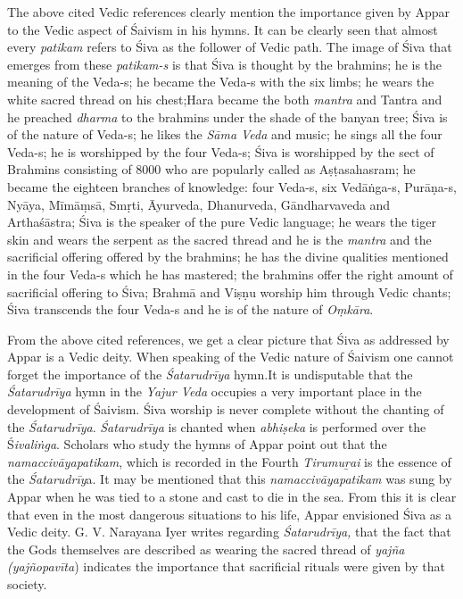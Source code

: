 The above cited Vedic references clearly mention the importance given by Appar to the Vedic aspect of Śaivism in his hymns. It can be clearly seen that almost every \textit{patikam} refers to Śiva as the follower of Vedic path. The image of Śiva that emerges from these \textit{patikam-s} is that Śiva is thought by the brahmins; he is the meaning of the Veda-s; he became the Veda-s with the six limbs; he wears the white sacred thread on his chest;Hara became the both \textit{mantra} and Tantra and he preached \textit{dharma} to the brahmins under the shade of the banyan tree; Śiva is of the nature of Veda-s; he likes the \textit{Sāma Veda} and music; he sings all the four Veda-s; he is worshipped by the four Veda-s; Śiva is worshipped by the sect of Brahmins consisting of 8000 who are popularly called as Aṣṭasahasram; he became the eighteen branches of knowledge: four Veda-s, six Vedāṅga-s, Purāṇa-s, Nyāya, Mīmāṃsā, Smṛti, Āyurveda, Dhanurveda, Gāndharvaveda and Arthaśāstra; Śiva is the speaker of the pure Vedic language; he wears the tiger skin and wears the serpent as the sacred thread and he is the \textit{mantra} and the sacrificial offering offered by the brahmins; he has the divine qualities mentioned in the four Veda-s which he has mastered; the brahmins offer the right amount of sacrificial offering to Śiva; Brahmā and Viṣṇu worship him through Vedic chants; Śiva transcends the four Veda-s and he is of the nature of \textit{Oṃkāra}.

From the above cited references, we get a clear picture that Śiva as addressed by Appar is a Vedic deity. When speaking of the Vedic nature of Śaivism one cannot forget the importance of the \textit{Śatarudrīya} hymn.It is undisputable that the \textit{Śatarudrīya} hymn in the \textit{Yajur Veda} occupies a very important place in the development of Śaivism. Śiva worship is never complete without the chanting of the \textit{Śatarudrīya}. \textit{Śatarudrīya} is chanted when \textit{abhiṣeka }is performed over the Ś\textit{ivaliṅga}. Scholars who study the hymns of Appar point out that the \textit{namaccivāyapatikam}, which is recorded in the Fourth \textit{Tirumuṟai} is the essence of the \textit{Śatarudrīy}a. It may be mentioned that this \textit{namaccivāyapatikam }was sung by Appar when he was tied to a stone and cast to die in the sea. From this it is clear that even in the most dangerous situations to his life, Appar envisioned Śiva as a Vedic deity. G. V. Narayana Iyer writes regarding \textit{Śatarudrīya,} that the fact that the Gods themselves are described as wearing the sacred thread of \textit{yajña (yajñopavīta}) indicates the importance that sacrificial rituals were given by that society.

